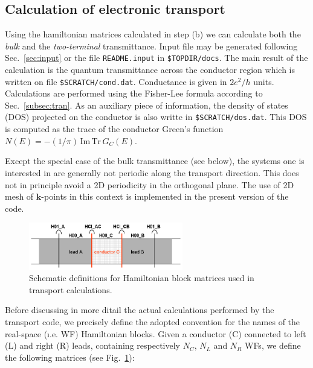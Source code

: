 
\subsection {Calculation of electronic transport}
\label{subsection:transport}

Using the hamiltonian matrices calculated in step (b) we can
calculate both the {\em bulk} and the {\em two-terminal} transmittance.
Input file may be generated following Sec.~\ref{sec:input}
or the file {\tt README.input} in {\tt \$TOPDIR/docs}. The main result of the 
calculation is the quantum transmittance across the conductor region
which is written on file {\tt \$SCRATCH/cond.dat}. Conductance is given
in $2e^2/h$ units. Calculations are performed using the Fisher-Lee formula
according to Sec.~\ref{subsec:tran}.
As an auxiliary piece of information, the density of states (DOS) projected on
the conductor is also writte in {\tt \$SCRATCH/dos.dat}.
This DOS is computed as the trace of the conductor Green's function
$ N(E) = -(1/\pi)\, \text{Im} \, \text{Tr}\, G_C(E)$.

Except the special case of the bulk transmittance (see below), the systems one is
interested in are generally not periodic along the transport direction. This does not
in principle avoid a 2D periodicity in the orthogonal plane. The use of 
2D mesh of $\mathbf{k}$-points in this context is implemented in the present 
version of the code.  \\

%
%
\begin{figure}
   \centering
   \includegraphics[clip,width=0.6\textwidth]{acb}
   \caption{Schematic definitions for Hamiltonian block matrices used in 
	    transport calculations. \label{fig:matrix_naming}}
\end{figure}
%
%
\noindent 
Before discussing in more ditail the actual calculations performed by
the transport code, we precisely define the adopted convention for the
names of the real-space ({\i.e.} WF) Hamiltonian blocks.  
Given a conductor (C) connected to left (L) and right (R) leads, containing
respectively $N_C$, $N_L$ and $N_R$ WFs, 
we define the following matrices (see Fig.~\ref{fig:matrix_naming}): \\

